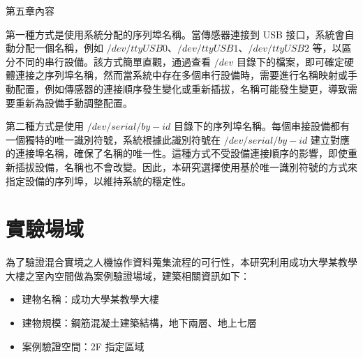 \allowdisplaybreaks[4]

第五章內容

第一種方式是使用系統分配的序列埠名稱。當傳感器連接到 USB 接口，系統會自動分配一個名稱，例如 $/dev/ttyUSB0$、$/dev/ttyUSB1$、$/dev/ttyUSB2$ 等，以區分不同的串行設備。該方式簡單直觀，通過查看 $/dev$ 目錄下的檔案，即可確定硬體連接之序列埠名稱，然而當系統中存在多個串行設備時，需要進行名稱映射或手動配置，例如傳感器的連接順序發生變化或重新插拔，名稱可能發生變更，導致需要重新為設備手動調整配置。

第二種方式是使用 $/dev/serial/by-id$ 目錄下的序列埠名稱。每個串接設備都有一個獨特的唯一識別符號，系統根據此識別符號在 $/dev/serial/by-id$ 建立對應的連接埠名稱，確保了名稱的唯一性。這種方式不受設備連接順序的影響，即使重新插拔設備，名稱也不會改變。因此，本研究選擇使用基於唯一識別符號的方式來指定設備的序列埠，以維持系統的穩定性。 

\section{實驗場域}

為了驗證混合實境之人機協作資料蒐集流程的可行性，本研究利用成功大學某教學大樓之室內空間做為案例驗證場域，建築相關資訊如下：

\begin{itemize}
  \item 建物名稱：成功大學某教學大樓
  \item 建物規模：鋼筋混凝土建築結構，地下兩層、地上七層
  \item 案例驗證空間：2F 指定區域
\end{itemize}

